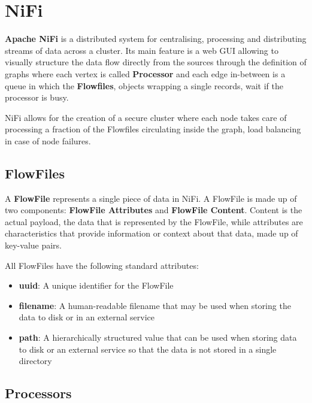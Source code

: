 \section{NiFi}

\textbf{Apache NiFi} is a distributed system for centralising, processing and distributing streams of data across a cluster. Its main feature is a web GUI allowing to visually structure the data flow directly from the sources through the definition of graphs where each vertex is called \textbf{Processor} and each edge in-between is a queue in which the \textbf{Flowfiles}, objects wrapping a single records, wait if the processor is busy.

NiFi allows for the creation of a secure cluster where each node takes care of processing a fraction of the Flowfiles circulating inside the graph, load balancing in case of node failures. 

\subsection{FlowFiles}

A \textbf{FlowFile} represents a single piece of data in NiFi. A FlowFile is made up of two components: \textbf{FlowFile Attributes} and \textbf{FlowFile Content}. Content is the actual payload, the data that is represented by the FlowFile, while attributes are characteristics that provide information or context about that data, made up of key-value pairs. 

All FlowFiles have the following standard attributes:

\begin{itemize}
    \item \textbf{uuid}: A unique identifier for the FlowFile
    
    \item \textbf{filename}: A human-readable filename that may be used when storing the data to disk or in an external service
    
    \item \textbf{path}: A hierarchically structured value that can be used when storing data to disk or an external service so that the data is not stored in a single directory
\end{itemize}

\subsection{Processors}

